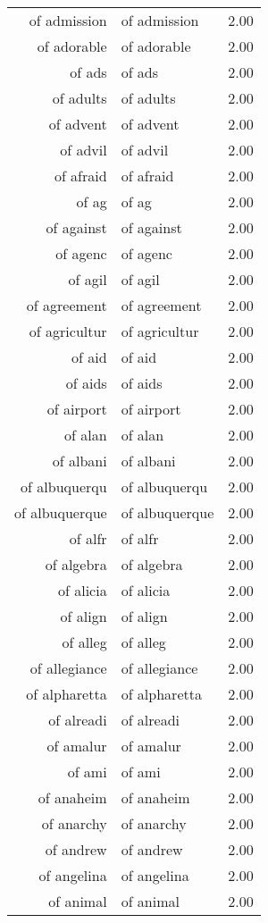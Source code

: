 \begin{table}[ht]
\begin{tabular}{rlr}
  of admission & of admission & 2.00 \\ 
  of adorable & of adorable & 2.00 \\ 
  of ads & of ads & 2.00 \\ 
  of adults & of adults & 2.00 \\ 
  of advent & of advent & 2.00 \\ 
  of advil & of advil & 2.00 \\ 
  of afraid & of afraid & 2.00 \\ 
  of ag & of ag & 2.00 \\ 
  of against & of against & 2.00 \\ 
  of agenc & of agenc & 2.00 \\ 
  of agil & of agil & 2.00 \\ 
  of agreement & of agreement & 2.00 \\ 
  of agricultur & of agricultur & 2.00 \\ 
  of aid & of aid & 2.00 \\ 
  of aids & of aids & 2.00 \\ 
  of airport & of airport & 2.00 \\ 
  of alan & of alan & 2.00 \\ 
  of albani & of albani & 2.00 \\ 
  of albuquerqu & of albuquerqu & 2.00 \\ 
  of albuquerque & of albuquerque & 2.00 \\ 
  of alfr & of alfr & 2.00 \\ 
  of algebra & of algebra & 2.00 \\ 
  of alicia & of alicia & 2.00 \\ 
  of align & of align & 2.00 \\ 
  of alleg & of alleg & 2.00 \\ 
  of allegiance & of allegiance & 2.00 \\ 
  of alpharetta & of alpharetta & 2.00 \\ 
  of alreadi & of alreadi & 2.00 \\ 
  of amalur & of amalur & 2.00 \\ 
  of ami & of ami & 2.00 \\ 
  of anaheim & of anaheim & 2.00 \\ 
  of anarchy & of anarchy & 2.00 \\ 
  of andrew & of andrew & 2.00 \\ 
  of angelina & of angelina & 2.00 \\ 
  of animal & of animal & 2.00 \\ 

\end{tabular}
\end{table}
